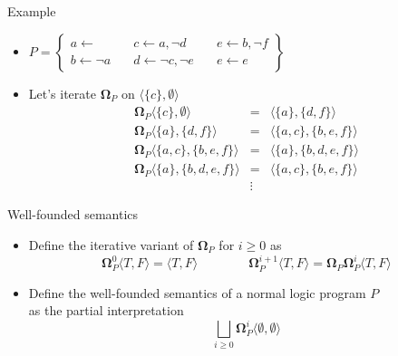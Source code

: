 \begin{frame}{Example}
  \bigskip
  \begin{itemize}
  \item<1->
    \(
    P
    =
    \left\{
      \begin{array}{lll}
        a \leftarrow                \quad &
        c \leftarrow a, \neg d      \quad &
        e \leftarrow b, \neg f
        \\
        b \leftarrow \neg a         \quad &
        d \leftarrow \neg c, \neg e \quad &
        e \leftarrow e
      \end{array}
    \right\}
    \)
    \bigskip
  \item<2-> Let's iterate ${\mathbf{\Omega}}_P$ on $\langle \{c\}, \emptyset\rangle$
    \[
    \begin{array}{rcl}
      {\mathbf{\Omega}}_{P}\langle\{c\}  ,\emptyset  \rangle &=&\langle\{a\}  ,\{d,f\}     \rangle
      \\
      {\mathbf{\Omega}}_{P}\langle\{a\}  ,\{d,f\}    \rangle &=&\langle\{a,c\},\{b,e,f\}   \rangle
      \\
      {\mathbf{\Omega}}_{P}\langle\{a,c\},\{b,e,f\}  \rangle &=&\langle\{a\}  ,\{b,d,e,f\} \rangle
      \\
      {\mathbf{\Omega}}_{P}\langle\{a\}  ,\{b,d,e,f\}\rangle &=&\langle\{a,c\},\{b,e,f\}   \rangle
      \\
      & \vdots &
    \end{array}
    \]
  \end{itemize}
\end{frame}
\begin{frame}{Well-founded semantics}
  \bigskip
  \begin{itemize}
  \item<1-> Define the iterative variant of ${\mathbf{\Omega}}_P$ for $i\geq 0$ as
    \[
    {\mathbf{\Omega}}_P^0\langle T, F \rangle = \langle T, F \rangle
    \qquad\qquad
    {\mathbf{\Omega}}_P^{i+1}\langle T, F \rangle =
    {\mathbf{\Omega}}_P{\mathbf{\Omega}}_P^i\langle T, F \rangle
    \]
  \item<2-> Define the \alert{well-founded semantics} of a normal logic program $P$\\
    as the partial interpretation
    \[
    \textstyle{\bigsqcup_{i \geq 0}} {\mathbf{\Omega}}_P^i \langle \emptyset, \emptyset \rangle
    \]
  \end{itemize}
  \nocite{gerosc91a}
\end{frame}
